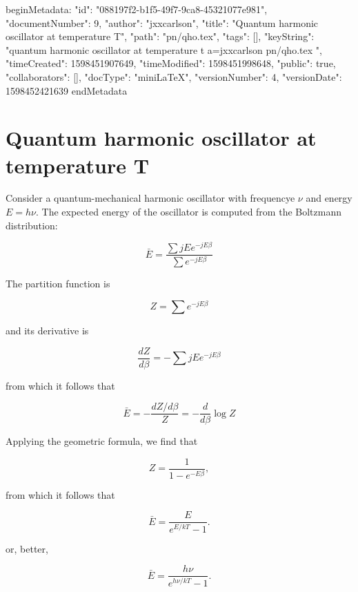 beginMetadata:
{
    "id": "088197f2-b1f5-49f7-9ca8-45321077e981",
    "documentNumber": 9,
    "author": "jxxcarlson",
    "title": "Quantum harmonic oscillator at temperature T",
    "path": "pn/qho.tex",
    "tags": [],
    "keyString": "quantum harmonic oscillator at temperature t a=jxxcarlson pn/qho.tex ",
    "timeCreated": 1598451907649,
    "timeModified": 1598451998648,
    "public": true,
    "collaborators": [],
    "docType": "miniLaTeX",
    "versionNumber": 4,
    "versionDate": 1598452421639
}
endMetadata

\setcounter{section}{4}

\section{Quantum harmonic oscillator at temperature T}

Consider a quantum-mechanical harmonic oscillator with frequencye $\nu$ and energy $E = h\nu$.  The expected energy of the oscillator is computed from the Boltzmann distribution:

\begin{equation}
\bar{E} = \frac{\sum jE e^{-jE\beta}}{\sum e^{-jE\beta}}
\end{equation}

The partition function is

\begin{equation}
Z = \sum e^{-jE\beta}
\end{equation}

and its derivative is


\begin{equation}
\frac{dZ}{d\beta} =  - \sum jE e^{-jE\beta}
\end{equation}

from which it follows that

\begin{equation}
\bar{E} = - \frac{dZ/d\beta}{Z} = - \frac{d}{d\beta} \log Z
\end{equation}

Applying the geometric formula, we find that

\begin{equation}
Z = \frac{1}{1 - e^{-E\beta}},
\end{equation}

from which it follows that

\begin{equation}
\bar{E} = \frac{E}{e^{E/kT} - 1}.
\end{equation}


or, better,


\begin{equation}
\bar{E} = \frac{h\nu}{e^{h\nu/kT} - 1}.
\end{equation}
